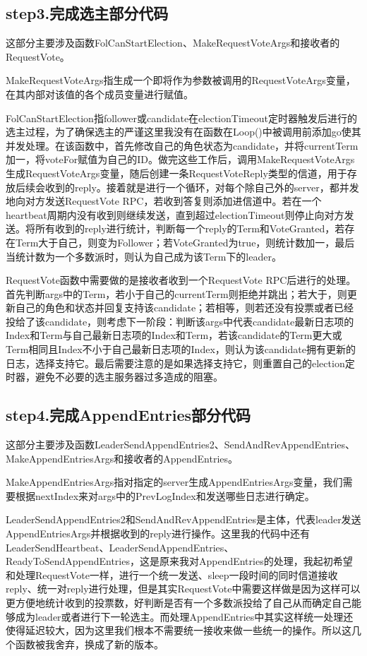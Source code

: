 \documentclass[UTF8]{article}
\begin{document}
\subsection{step3.完成选主部分代码}
这部分主要涉及函数FolCanStartElection、MakeRequestVoteArgs和接收者的RequestVote。

MakeRequestVoteArgs指生成一个即将作为参数被调用的RequestVoteArgs变量，在其内部对该值的各个成员变量进行赋值。

FolCanStartElection指follower或candidate在electionTimeout定时器触发后进行的选主过程，为了确保选主的严谨这里我没有在函数在Loop()中被调用前添加go使其并发处理。在该函数中，首先修改自己的角色状态为candidate，并将currentTerm加一，将voteFor赋值为自己的ID。做完这些工作后，调用MakeRequestVoteArgs生成RequestVoteArgs变量，随后创建一条RequestVoteReply类型的信道，用于存放后续会收到的reply。接着就是进行一个循环，对每个除自己外的server，都并发地向对方发送RequestVote RPC，若收到答复则添加进信道中。若在一个heartbeat周期内没有收到则继续发送，直到超过electionTimeout则停止向对方发送。将所有收到的reply进行统计，判断每一个reply的Term和VoteGranted，若存在Term大于自己，则变为Follower；若VoteGranted为true，则统计数加一，最后当统计数为一个多数派时，则认为自己成为该Term下的leader。

RequestVote函数中需要做的是接收者收到一个RequestVote RPC后进行的处理。首先判断args中的Term，若小于自己的currentTerm则拒绝并跳出；若大于，则更新自己的角色和状态并回复支持该candidate；若相等，则若还没有投票或者已经投给了该candidate，则考虑下一阶段：判断该args中代表candidate最新日志项的Index和Term与自己最新日志项的Index和Term，若该candidate的Term更大或Term相同且Index不小于自己最新日志项的Index，则认为该candidate拥有更新的日志，选择支持它。最后需要注意的是如果选择支持它，则重置自己的election定时器，避免不必要的选主服务器过多造成的阻塞。

\subsection{step4.完成AppendEntries部分代码}
这部分主要涉及函数LeaderSendAppendEntries2、SendAndRevAppendEntries、MakeAppendEntriesArgs和接收者的AppendEntries。

MakeAppendEntriesArgs指对指定的server生成AppendEntriesArgs变量，我们需要根据nextIndex来对args中的PrevLogIndex和发送哪些日志进行确定。

LeaderSendAppendEntries2和SendAndRevAppendEntries是主体，代表leader发送AppendEntriesArgs并根据收到的reply进行操作。这里我的代码中还有LeaderSendHeartbeat、LeaderSendAppendEntries、ReadyToSendAppendEntries，这是原来我对AppendEntries的处理，我起初希望和处理RequestVote一样，进行一个统一发送、sleep一段时间的同时信道接收reply、统一对reply进行处理，但是其实RequestVote中需要这样做是因为这样可以更方便地统计收到的投票数，好判断是否有一个多数派投给了自己从而确定自己能够成为leader或者进行下一轮选主。而处理AppendEntries中其实这样统一处理还使得延迟较大，因为这里我们根本不需要统一接收来做一些统一的操作。所以这几个函数被我舍弃，换成了新的版本。
\end{document}
